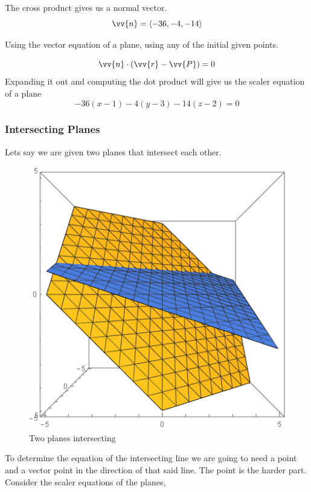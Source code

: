 The cross product gives us a normal vector.
\begin{equation*}
	\vv{n} = \langle -36,-4,-14 \rangle 
\end{equation*}

Using the vector equation of a plane, using any of the initial given points.

\begin{equation*}
	\vv{n} \cdot (\vv{r}-\vv{P}) = 0
\end{equation*}
Expanding it out and computing the dot product will give us the scaler equation of a plane 
\begin{equation*}
	-36(x-1)-4(y-3)-14(z-2)=0
\end{equation*}
\subsubsection{Intersecting Planes}
Lets say we are given two planes that intersect each other. 
\begin{figure}[H]
	\begin{center}
		\includegraphics[scale=0.45]{pages/images/plane_intersection.png}
		\caption{Two planes intersecting}	
		\label{fig:test_figure}
	\end{center}
\end{figure}
To determine the equation of the intersecting line we are going to need a point and a vector point in the direction of that said line. The point is the harder part. Consider the scaler equations of the planes, 

